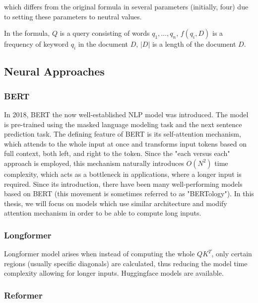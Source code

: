 which differs from the original formula in several parameters (initially, four) due to setting these parameters to neutral values.

In the formula, $Q$ is a query consisting of words $q_1,\ldots,q_n$, $f(q_i,D)$ is a frequency of keyword $q_i$ in the document $D$, $|D|$ is a length of the document $D$. 



\subsection{Neural Approaches}

\subsubsection{BERT}
In 2018, BERT \citep{bert} the now well-established NLP model was introduced. The model is pre-trained using the masked language modeling task and the next sentence prediction task.
The defining feature of BERT is its self-attention mechanism, which attends to the whole input at once and transforms input tokens based on full context, both left, and right to the token.
Since the "each versus each" approach is employed, this mechanism naturally introduces $O(N^2)$ time complexity, which acts as a bottleneck in applications, where a longer input is required.
Since its introduction, there have been many well-performing models based on BERT (this movement is sometimes referred to as "BERTology").
In this thesis, we will focus on models which use similar architecture and modify attention mechanism in order to be able to compute long inputs.

\subsubsection{Longformer}

Longformer model \citep{longformer} arises when instead of computing the whole $QK^T$, only certain regions (usually specific diagonals) are calculated, thus reducing the model time complexity allowing for longer inputs.
Huggingface models are available.

\subsubsection{Reformer}

